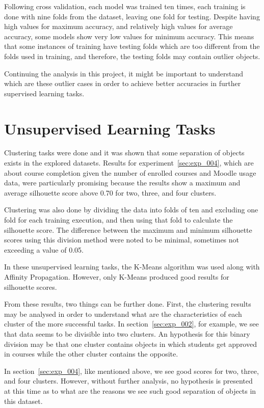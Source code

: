 Following cross validation, each model was trained ten times, each training is
done with nine folds from the dataset, leaving one fold for testing. Despite
having high values for maximum accuracy, and relatively high values for average
accuracy, some models show very low values for minimum accuracy. This means
that some instances of training have testing folds which are too different from
the folds used in training, and therefore, the testing folds may contain
outlier objects.

Continuing the analysis in this project, it might be important to understand
which are these outlier cases in order to achieve better accuracies in further
supervised learning tasks.

\section{Unsupervised Learning Tasks}

Clustering tasks were done and it was shown that some separation of objects
exists in the explored datasets. Results for experiment~\ref{sec:exp_004},
which are about course completion given the number of enrolled courses and
Moodle usage data, were particularly promising because the results show a
maximum and average silhouette score above 0.70 for two, three, and four
clusters.

Clustering was also done by dividing the data into folds of ten and excluding
one fold for each training execution, and then using that fold to calculate the
silhouette score. The difference between the maximum and minimum silhouette
scores using this division method were noted to be minimal, sometimes not
exceeding a value of 0.05.

In these unsupervised learning tasks, the K-Means algorithm was used along with
Affinity Propagation. However, only K-Means produced good results for
silhouette scores.

From these results, two things can be further done. First, the clustering
results may be analysed in order to understand what are the characteristics of
each cluster of the more successful tasks. In section~\ref{sec:exp_002}, for
example, we see that data seems to be divisible into two clusters. An
hypothesis for this binary division may be that one cluster contains objects in
which students get approved in courses while the other cluster contains the
opposite.

In section~\ref{sec:exp_004}, like mentioned above, we see good scores for two,
three, and four clusters. However, without further analysis, no hypothesis is
presented at this time as to what are the reasons we see such good separation
of objects in this dataset.

